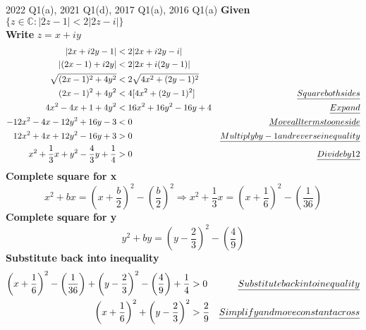 \documentclass[a4paper, 8pt]{extarticle}
\begin{document}
\begin{examplebox}{2022 Q1(a), 2021 Q1(d), 2017 Q1(a), 2016 Q1(a)}{}
	\label{sol:2022Q1a}
	\textbf{Given} $\{ z \in \mathbb{C} : |2z - 1| < 2|2z-i|\}$ \\
	\textbf{Write} $z = x + iy$
	\begin{align*}
		|2x + i2y -1 |                                        & < 2 |2x + i2y - i|                                                        \\
		|(2x -1) + i2y|                                       & < 2 |2x + i(2y -1)|                                                       \\
		\sqrt{(2x-1)^2 + 4y^2}                                & < 2 \sqrt{4x^2 + (2y-1)^2}                                                \\
		(2x-1)^2 + 4y^2                                       & < 4[4x^2 + (2y-1)^2]       & \emph{Square both sides}                     \\
		4x^2 - 4x + 1 + 4y^2                                  & < 16x^2 + 16y^2 -16y +4    & \emph{Expand}                                \\
		-12x^2 - 4x - 12y^2 + 16y -3                          & < 0                        & \emph{Move all terms to one side}            \\
		12x^2 + 4x + 12y^2 - 16y + 3                          & > 0                        & \emph{Multiply by -1 and reverse inequality} \\
		x^2 + \frac{1}{3}x + y^2 - \frac{4}{3}y + \frac{1}{4} & > 0                        & \emph{Divide by 12}                          \\
	\end{align*}
	\textbf{Complete square for x}
	$$x^2 + bx = \left(x + \frac{b}{2}\right)^2 - \left(\frac{b}{2}\right)^2 \Rightarrow x^2 + \frac{1}{3}x = \left(x + \frac{1}{6}\right)^2 - \left(\frac{1}{36}\right)$$
	\textbf{Complete square for y}
	$$y^2 + by = \left(y - \frac{2}{3}\right)^2 - \left(\frac{4}{9}\right)$$
	\textbf{Substitute back into inequality}
	\begin{align*}
		\left(x + \frac{1}{6}\right)^2 - \left(\frac{1}{36}\right) + \left(y - \frac{2}{3}\right)^2 - \left(\frac{4}{9}\right)  + \frac{1}{4} & > 0            & \emph{Substitute back into inequality}   \\
		\left(x + \frac{1}{6}\right)^2 + \left(y - \frac{2}{3}\right)^2                                                                       & >  \frac{2}{9} & \emph{Simplify and move constant across} \\
	\end{align*}


\end{examplebox}
\end{document}
